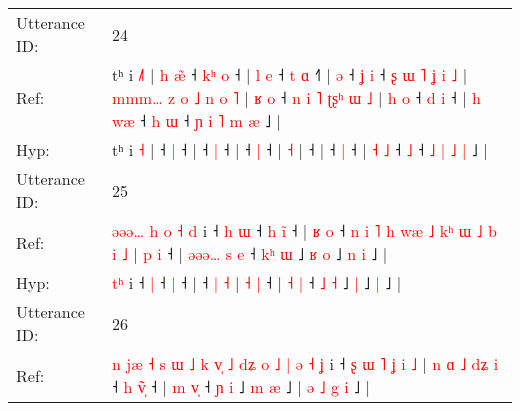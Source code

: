 \documentclass[10pt]{article}
\DeclareRobustCommand{\hl}[1]{{\textcolor{red}{#1}}}
\begin{document}
\begin{longtable}{ll}
 \\
\midrule
Utterance ID: & 24 \\
Ref: & tʰ i \hl{˩}\hl{˥} |\hl{ }\hl{h}\hl{ }\hl{æ}\hl{̃} ˧\hl{ }\hl{k}\hl{ʰ} \hl{o} ˧ |\hl{ }\hl{l}\hl{ }\hl{e} ˧\hl{ }\hl{t} \hl{ɑ} ˧\hl{˥} |\hl{ }\hl{ə} ˧\hl{ }\hl{ʝ} \hl{i} ˧\hl{ }\hl{ʂ}\hl{ }\hl{ɯ}\hl{ }\hl{˥}\hl{ }\hl{ʝ}\hl{ }\hl{i}\hl{ }\hl{˩} |\hl{ }\hl{m}\hl{m}\hl{m}\hl{…}\hl{ }\hl{z}\hl{ }\hl{o}\hl{ }\hl{˩}\hl{ }\hl{n}\hl{ }\hl{o} \hl{˥} |\hl{ }\hl{ʁ}\hl{ }\hl{o} ˧\hl{ }\hl{n}\hl{ }\hl{i}\hl{ }\hl{˥}\hl{ }\hl{ʈ}\hl{ʂ}\hl{ʰ}\hl{ }\hl{ɯ}\hl{ }\hl{˩} |\hl{ }\hl{h}\hl{ }\hl{o} ˧\hl{ }\hl{d} \hl{i} ˧ | \hl{h} \hl{w}\hl{æ} ˧\hl{ }\hl{h} \hl{ɯ} ˧\hl{ }\hl{ɲ} \hl{i} \hl{˥} \hl{m} \hl{æ} ˩ |
 \\
Hyp: & tʰ i \hl{}\hl{˧} |\hl{}\hl{}\hl{}\hl{}\hl{} ˧\hl{}\hl{}\hl{} \hl{|} ˧ |\hl{}\hl{}\hl{}\hl{} ˧\hl{}\hl{} \hl{|} ˧\hl{} |\hl{}\hl{} ˧\hl{}\hl{} \hl{|} ˧\hl{}\hl{}\hl{}\hl{}\hl{}\hl{}\hl{}\hl{}\hl{}\hl{}\hl{}\hl{} |\hl{}\hl{}\hl{}\hl{}\hl{}\hl{}\hl{}\hl{}\hl{}\hl{}\hl{}\hl{}\hl{}\hl{}\hl{} \hl{˧} |\hl{}\hl{}\hl{}\hl{} ˧\hl{}\hl{}\hl{}\hl{}\hl{}\hl{}\hl{}\hl{}\hl{}\hl{}\hl{}\hl{}\hl{}\hl{} |\hl{}\hl{}\hl{}\hl{} ˧\hl{}\hl{} \hl{|} ˧ | \hl{˧} \hl{}\hl{˩} ˧\hl{}\hl{} \hl{˩} ˧\hl{}\hl{} \hl{˩} \hl{|} \hl{˩} \hl{|} ˩ |
 \\
\midrule
Utterance ID: & 25 \\
Ref: & \hl{ə}\hl{ə}\hl{ə}\hl{…}\hl{ }\hl{h}\hl{ }\hl{o}\hl{ }\hl{˧}\hl{ }\hl{d} i ˧\hl{ }\hl{h} \hl{ɯ} ˧\hl{ }\hl{h} \hl{i}\hl{̃} ˧ |\hl{ }\hl{ʁ}\hl{ }\hl{o} ˧\hl{ }\hl{n}\hl{ }\hl{i}\hl{ }\hl{˥}\hl{ }\hl{h}\hl{ }\hl{w}\hl{æ}\hl{ }\hl{˩}\hl{ }\hl{k}\hl{ʰ}\hl{ }\hl{ɯ}\hl{ }\hl{˩}\hl{ }\hl{b} \hl{i} \hl{˩} | \hl{p} \hl{i} ˧ |\hl{ }\hl{ə}\hl{ə}\hl{ə}\hl{…} \hl{s} \hl{e} ˧ \hl{k}\hl{ʰ} \hl{ɯ} ˩\hl{ }\hl{ʁ} \hl{o} ˩\hl{ }\hl{n} \hl{i} ˩ |
 \\
Hyp: & \hl{}\hl{}\hl{}\hl{}\hl{}\hl{}\hl{}\hl{}\hl{}\hl{}\hl{t}\hl{ʰ} i ˧\hl{}\hl{} \hl{|} ˧\hl{}\hl{} \hl{}\hl{|} ˧ |\hl{}\hl{}\hl{}\hl{} ˧\hl{}\hl{}\hl{}\hl{}\hl{}\hl{}\hl{}\hl{}\hl{}\hl{}\hl{}\hl{}\hl{}\hl{}\hl{}\hl{}\hl{}\hl{}\hl{}\hl{}\hl{}\hl{} \hl{|} \hl{˧} | \hl{˧} \hl{|} ˧ |\hl{}\hl{}\hl{}\hl{}\hl{} \hl{˧} \hl{|} ˧ \hl{}\hl{˩} \hl{˧} ˩\hl{}\hl{} \hl{|} ˩\hl{}\hl{} \hl{|} ˩ |
 \\
\midrule
Utterance ID: & 26 \\
Ref: & \hl{n}\hl{ }\hl{j}\hl{æ}\hl{ }\hl{˧}\hl{ }\hl{s}\hl{ }\hl{ɯ}\hl{ }\hl{˩}\hl{ }\hl{k}\hl{ }\hl{v}\hl{̩}\hl{ }\hl{˩}\hl{ }\hl{d}\hl{ʑ}\hl{ }\hl{o}\hl{ }\hl{˩}\hl{ }\hl{|}\hl{ }\hl{ə}\hl{ }\hl{˧}\hl{ }\hl{ʝ} i ˧\hl{ }\hl{ʂ}\hl{ }\hl{ɯ}\hl{ }\hl{˥}\hl{ }\hl{ʝ}\hl{ }\hl{i}\hl{ }\hl{˩} |\hl{ }\hl{n}\hl{ }\hl{ɑ}\hl{ }\hl{˩}\hl{ }\hl{d}\hl{ʑ}\hl{ }\hl{i} ˧\hl{ }\hl{h} \hl{v}\hl{̃}\hl{̩} ˧ |\hl{ }\hl{m}\hl{ }\hl{v}\hl{̩} ˧ \hl{ɲ} \hl{i} ˩\hl{ }\hl{m} \hl{æ} ˩ |\hl{ }\hl{ə}\hl{ }\hl{˩}\hl{ }\hl{g}\hl{ }\hl{i} ˩ |

\end{longtable}
\end{document}
